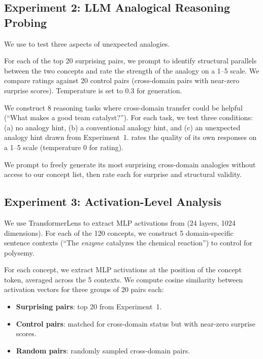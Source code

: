\subsection{Experiment 2: LLM Analogical Reasoning Probing}
\label{sec:exp2}

We use \gptfour to test three aspects of unexpected analogies.

For each of the top 20 surprising pairs, we prompt \gptfour to identify structural parallels between the two concepts and rate the strength of the analogy on a 1--5 scale.
We compare ratings against 20 control pairs (cross-domain pairs with near-zero surprise scores).
Temperature is set to 0.3 for generation.

We construct 8 reasoning tasks where cross-domain transfer could be helpful (\eg ``What makes a good team catalyst?'').
For each task, we test three conditions: (a) no analogy hint, (b) a conventional analogy hint, and (c) an unexpected analogy hint drawn from Experiment~1.
\gptfour rates the quality of its own responses on a 1--5 scale (temperature 0 for rating).

We prompt \gptfour to freely generate its most surprising cross-domain analogies without access to our concept list, then rate each for surprise and structural validity.

\subsection{Experiment 3: Activation-Level Analysis}
\label{sec:exp3}

We use TransformerLens \citep{nanda2023transformerlens} to extract MLP activations from \pythia \citep{biderman2023pythia} (24 layers, 1024 dimensions).
For each of the 120 concepts, we construct 5 domain-specific sentence contexts (\eg ``The \emph{enzyme} catalyzes the chemical reaction'') to control for polysemy.

For each concept, we extract MLP activations at the position of the concept token, averaged across the 5 contexts.
We compute cosine similarity between activation vectors for three groups of 20 pairs each:
\begin{itemize}[leftmargin=*,itemsep=0pt,topsep=0pt]
    \item \textbf{Surprising pairs}: top 20 from Experiment~1.
    \item \textbf{Control pairs}: matched for cross-domain status but with near-zero surprise scores.
    \item \textbf{Random pairs}: randomly sampled cross-domain pairs.
\end{itemize}

